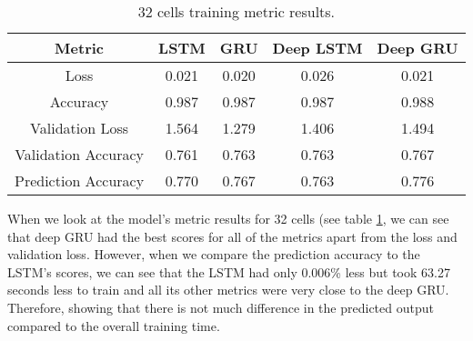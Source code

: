 \documentclass[a4paper,10pt]{article}
\begin{document}
	
	\begin{table}[ht]
		\centering
		\small
		\begin{tabular}[t]{ | c | c | c | c | c | }
			\hline
			Metric          & LSTM  & GRU   & Deep LSTM & Deep GRU \\ 
			\hline
			Loss            & 0.021 & 0.020 & 0.026     & 0.021 \\ 
			\hline
			Accuracy        & 0.987 & 0.987 & 0.987     & 0.988  \\ 
			\hline
			Validation Loss & 1.564 & 1.279 & 1.406 & 1.494 \\
			\hline
			Validation Accuracy & 0.761 & 0.763 & 0.763 & 0.767 \\
			\hline
			Prediction Accuracy & 0.770     & 0.767 & 0.763     & 0.776 \\
			\hline 
		\end{tabular}
		\caption{32 cells training metric results.}
		\label{tab:32_metrics}
	\end{table}%

	When we look at the model's metric results for 32 cells (see table \ref{tab:32_metrics}, we can see that deep GRU had the best scores for all of the metrics apart from the loss and validation loss. However, when we compare the prediction accuracy to the LSTM's scores, we can see that the LSTM had only 0.006\% less but took 63.27 seconds less to train and all its other metrics were very close to the deep GRU. Therefore, showing that there is not much difference in the predicted output compared to the overall training time.
\end{document}
